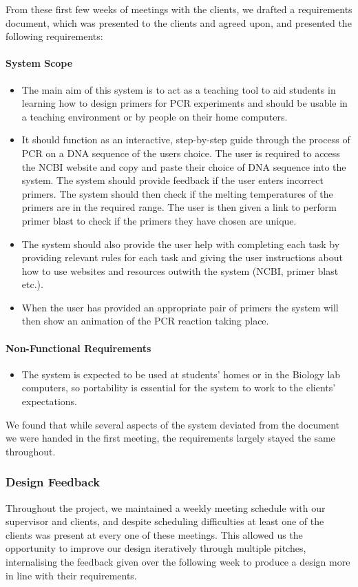 From these first few weeks of meetings with the clients, we drafted a
requirements document, which was presented to the clients and agreed upon,
and presented the following requirements:

\paragraph{System Scope}
\begin{itemize}
\item{The main aim of this system is to act as a teaching tool to aid 
students in learning how to design primers for PCR experiments and 
should be usable in a teaching environment or by people on their home 
computers.}
\item{It should function as an interactive, step-by-step guide through 
the process of PCR on a DNA sequence of the users choice. The user is 
required to access the NCBI website and copy and paste their choice
of DNA sequence into the system. The system should provide feedback if 
the user enters incorrect primers. The system should then check if the 
melting temperatures of the primers are in the required range. The user
is then given a link to perform primer blast to check if the primers 
they have chosen are unique.}
\item{The system should also provide the user help with completing each 
task by providing relevant rules for each task and giving the user 
instructions about how to use websites and resources outwith the system 
(NCBI, primer blast etc.).}
\item{When the user has provided an appropriate pair of primers the 
system will then show an animation of the PCR reaction taking place.}
\end{itemize}
\paragraph{Non-Functional Requirements}
\begin{itemize}
\item{The system is expected to be used at students’ homes or in the 
Biology lab computers, so portability is essential for the system to 
work to the clients’ expectations.}
\end{itemize}
We found that while several aspects of the system deviated from the
document we were handed in the first meeting, the requirements largely
stayed the same throughout.

\subsubsection{Design Feedback}
Throughout the project, we maintained a weekly meeting schedule with our
supervisor and clients, and despite scheduling difficulties at least one
of the clients was present at every one of these meetings. This allowed
us the opportunity to improve our design iteratively through multiple
pitches, internalising the feedback given over the following week to 
produce a design more in line with their requirements.

